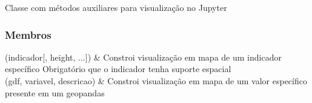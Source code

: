 \documentclass[letterpaper,10pt,brazil]{sphinxmanual}
\begin{document}
\begin{fulllineitems}
\label{\detokenize{api_gen/apiModulo.api_visualizacao:apiModulo.api_visualizacao.ApiVis}}
\pysigstartsignatures
{}
\pysigstopsignatures
\sphinxAtStartPar
Classe com métodos auxiliares para visualização no Jupyter
\subsubsection*{Membros}


\begin{savenotes}\sphinxattablestart
\sphinxthistablewithglobalstyle
\sphinxthistablewithnovlinesstyle
\centering
\begin{tabulary}{\linewidth}[t]{}
\sphinxtoprule
\sphinxtableatstartofbodyhook
\sphinxAtStartPar
{\hyperref[\detokenize{api_gen/apiModulo.api_visualizacao:apiModulo.api_visualizacao.ApiVis.visMapaIndicador}]{}}(indicador{[}, height, ...{]})
&
\sphinxAtStartPar
Constroi visualização em mapa de um indicador específico Obrigatório que o indicador tenha suporte espacial
\\
\sphinxhline
\sphinxAtStartPar
{\hyperref[\detokenize{api_gen/apiModulo.api_visualizacao:apiModulo.api_visualizacao.ApiVis.visMapaGJson}]{}}(gdf, variavel, descricao)
&
\sphinxAtStartPar
Constroi visualização em mapa de um valor específico presente em um geopandas
\\
\sphinxbottomrule
\end{tabulary}
\sphinxtableafterendhook\par
\sphinxattableend\end{savenotes}


\end{fulllineitems}
\end{document}
